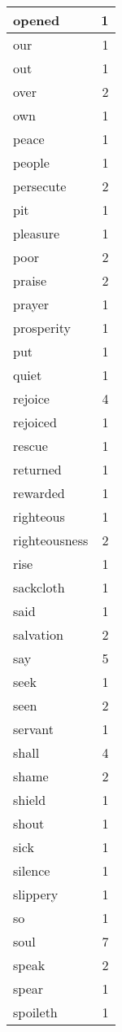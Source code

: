 \begin{center}
\begin{longtable}{l|r}
opened & 1 \\ \hline
our & 1 \\ \hline
out & 1 \\ \hline
over & 2 \\ \hline
own & 1 \\ \hline
peace & 1 \\ \hline
people & 1 \\ \hline
persecute & 2 \\ \hline
pit & 1 \\ \hline
pleasure & 1 \\ \hline
poor & 2 \\ \hline
praise & 2 \\ \hline
prayer & 1 \\ \hline
prosperity & 1 \\ \hline
put & 1 \\ \hline
quiet & 1 \\ \hline
rejoice & 4 \\ \hline
rejoiced & 1 \\ \hline
rescue & 1 \\ \hline
returned & 1 \\ \hline
rewarded & 1 \\ \hline
righteous & 1 \\ \hline
righteousness & 2 \\ \hline
rise & 1 \\ \hline
sackcloth & 1 \\ \hline
said & 1 \\ \hline
salvation & 2 \\ \hline
say & 5 \\ \hline
seek & 1 \\ \hline
seen & 2 \\ \hline
servant & 1 \\ \hline
shall & 4 \\ \hline
shame & 2 \\ \hline
shield & 1 \\ \hline
shout & 1 \\ \hline
sick & 1 \\ \hline
silence & 1 \\ \hline
slippery & 1 \\ \hline
so & 1 \\ \hline
soul & 7 \\ \hline
speak & 2 \\ \hline
spear & 1 \\ \hline
spoileth & 1 \\ \hline

\end{longtable}
\end{center}
